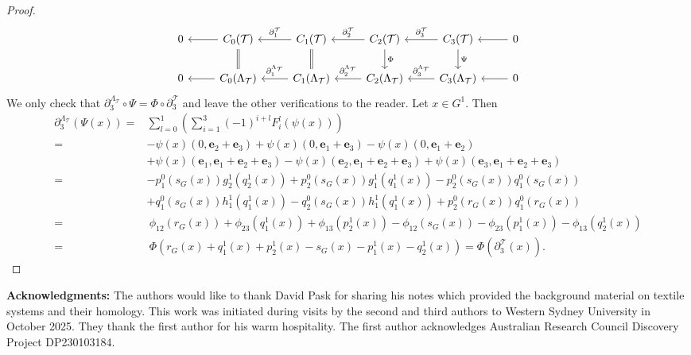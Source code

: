 \documentclass[a4paper,reqno,12pt]{amsart}
\newcommand{\ea}{\mathbf{e}_1}
\newcommand{\eb}{\mathbf{e}_2}
\newcommand{\ec}{\mathbf{e}_3}
\theoremstyle{definition}
\theoremstyle{remark}
\def\mT{\mathcal{T}}
\begin{document}
\begin{proof}
\[
\begin{tikzcd}
0 & C_0(\mathcal{T}) \arrow[l] \arrow[d, equal] & C_1(\mathcal{T}) \arrow[l, "\partial_1^\mT"'] \arrow[d, equal] & C_2(\mathcal{T}) \arrow[l, "\partial_2^\mT"'] \arrow[d, "\Phi"] & C_3(\mathcal{T}) \arrow[l, "\partial_3^\mT"'] \arrow[d, "\Psi"] & 0 \arrow[l] \\
0 & C_0(\Lambda_{\mathcal{T}}) \arrow[l]         & C_1(\Lambda_{\mathcal{T}}) \arrow[l, "\partial_1^{\Lambda_{\mathcal{T}}}"'] & C_2(\Lambda_{\mathcal{T}}) \arrow[l, "\partial_2^{\Lambda_{\mathcal{T}}}"'] & C_3(\Lambda_{\mathcal{T}}) \arrow[l, "\partial_3^{\Lambda_{\mathcal{T}}}"'] & 0 \arrow[l]
\end{tikzcd}
\]
We only check that $\partial_3^{\Lambda_\mT}\circ \Psi=\Phi\circ \partial_3^\mT$ and leave the other verifications to the reader. Let $x\in G^1$. Then 
\begin{align*}
\partial_3^{\Lambda_\mT}(\Psi(x))=&\displaystyle{\sum_{l=0}^{1}}\left(\displaystyle{\sum_{i=1}^{3}}(-1)^{i+l}F_i^l(\psi(x))\right)\\
=&-\psi(x)(0,\eb+\ec)+\psi(x)(0,\ea+\ec)-\psi(x)(0,\ea+\eb)\\
&+\psi(x)(\ea,\ea+\eb+\ec)-\psi(x)(\eb,\ea+\eb+\ec)+\psi(x)(\ec,\ea+\eb+\ec)\\
=&-p_1^0(s_G(x))g_2^1(q_2^1(x))+p_2^0(s_G(x))g_1^1(q_1^1(x))-p_2^0(s_G(x))q_1^0(s_G(x))\\
&+q_1^0(s_G(x))h_1^1(q_1^1(x))-q_2^0(s_G(x))h_1^1(q_1^1(x))+p_2^0(r_G(x))q_1^0(r_G(x))\\
=&~ \phi_{12}(r_G(x))+\phi_{23}(q_1^1(x))+\phi_{13}(p_2^1(x))-\phi_{12}(s_G(x))-\phi_{23}(p_1^1(x))-\phi_{13}(q_2^1(x))\\
=&~\Phi(r_G(x)+q_1^1(x)+p_2^1(x)-s_G(x)-p_1^1(x)-q_2^1(x))=\Phi(\partial_3^\mT(x)).
\end{align*}
\end{proof}

\textbf{Acknowledgments:} The authors would like to thank David Pask for sharing his notes which provided the background material on textile systems and their homology. This work was initiated during visits by the second and third authors to Western Sydney University in October 2025. They thank the first author for his warm hospitality. The first author acknowledges Australian Research Council Discovery Project DP230103184.
\end{document}
